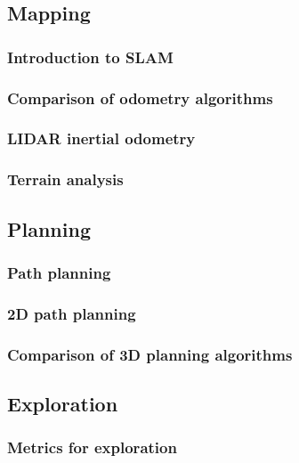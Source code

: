 \documentclass[11pt]{article}
\begin{document}
    \subsection{Mapping}
        
        \subsubsection{Introduction to SLAM}
        \subsubsection{Comparison of odometry algorithms}
        \subsubsection{LIDAR inertial odometry}
        \subsubsection{Terrain analysis}
    \subsection{Planning}
        \subsubsection{Path planning}
        \subsubsection{2D path planning}
        \subsubsection{Comparison of 3D planning algorithms}

    \subsection{Exploration}
        \subsubsection{Metrics for exploration}
\end{document}
